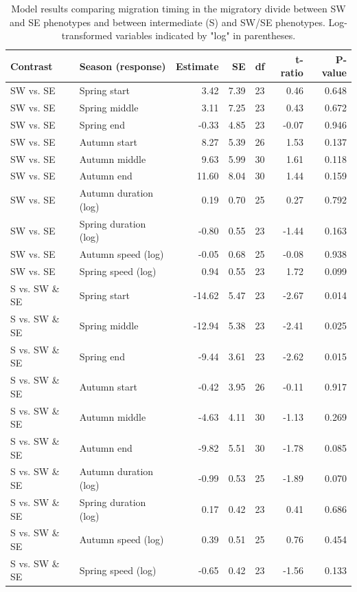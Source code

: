 \documentclass[a4paper, twoside]{templates/ociamthesis}
\begin{document}
\begin{table}[t]

\caption{\label{tab:divide-timing-table}Model results comparing migration timing in the migratory divide between SW and SE phenotypes and between intermediate (S) and SW/SE phenotypes. Log-transformed variables indicated by "log" in parentheses.}
\centering
\fontsize{9.5}{11.5}\selectfont
\begin{tabular}{l|l|r|r|r|r|r}
\hline
Contrast & Season (response) & Estimate & SE & df & t-ratio & P-value\\
\hline
SW vs. SE & Spring start & 3.42 & 7.39 & 23 & 0.46 & 0.648\\
\hline
SW vs. SE & Spring middle & 3.11 & 7.25 & 23 & 0.43 & 0.672\\
\hline
SW vs. SE & Spring end & -0.33 & 4.85 & 23 & -0.07 & 0.946\\
\hline
SW vs. SE & Autumn start & 8.27 & 5.39 & 26 & 1.53 & 0.137\\
\hline
SW vs. SE & Autumn middle & 9.63 & 5.99 & 30 & 1.61 & 0.118\\
\hline
SW vs. SE & Autumn end & 11.60 & 8.04 & 30 & 1.44 & 0.159\\
\hline
SW vs. SE & Autumn duration (log) & 0.19 & 0.70 & 25 & 0.27 & 0.792\\
\hline
SW vs. SE & Spring duration (log) & -0.80 & 0.55 & 23 & -1.44 & 0.163\\
\hline
SW vs. SE & Autumn speed (log) & -0.05 & 0.68 & 25 & -0.08 & 0.938\\
\hline
SW vs. SE & Spring speed (log) & 0.94 & 0.55 & 23 & 1.72 & 0.099\\
\hline
S vs. SW \& SE & Spring start & -14.62 & 5.47 & 23 & -2.67 & 0.014\\
\hline
S vs. SW \& SE & Spring middle & -12.94 & 5.38 & 23 & -2.41 & 0.025\\
\hline
S vs. SW \& SE & Spring end & -9.44 & 3.61 & 23 & -2.62 & 0.015\\
\hline
S vs. SW \& SE & Autumn start & -0.42 & 3.95 & 26 & -0.11 & 0.917\\
\hline
S vs. SW \& SE & Autumn middle & -4.63 & 4.11 & 30 & -1.13 & 0.269\\
\hline
S vs. SW \& SE & Autumn end & -9.82 & 5.51 & 30 & -1.78 & 0.085\\
\hline
S vs. SW \& SE & Autumn duration (log) & -0.99 & 0.53 & 25 & -1.89 & 0.070\\
\hline
S vs. SW \& SE & Spring duration (log) & 0.17 & 0.42 & 23 & 0.41 & 0.686\\
\hline
S vs. SW \& SE & Autumn speed (log) & 0.39 & 0.51 & 25 & 0.76 & 0.454\\
\hline
S vs. SW \& SE & Spring speed (log) & -0.65 & 0.42 & 23 & -1.56 & 0.133\\
\hline
\end{tabular}
\end{table}
\end{document}
